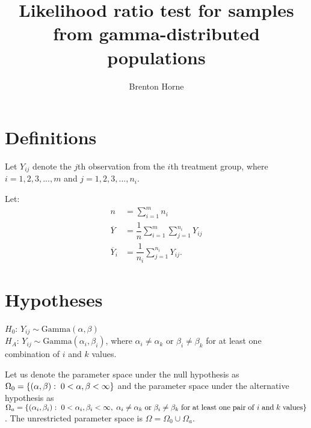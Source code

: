 \documentclass[12pt,a4paper,openright]{article}
\title{Likelihood ratio test for samples from gamma-distributed populations}
\author{Brenton Horne}
\newcommand{\GamD}{\mathrm{Gamma}}
\begin{document}
	\maketitle
	\tableofcontents
	\newpage
	
	\section{Definitions}
	Let $Y_{ij}$ denote the $j$th observation from the $i$th treatment group, where $i=1, 2, 3, ..., m$ and $j=1, 2, 3, ..., n_i$. 
	
	Let:
	\begin{align*}
		n &= \sum_{i=1}^m n_i \\
		\overline{Y} &= \dfrac{1}{n} \sum_{i=1}^m \sum_{j=1}^{n_i} Y_{ij} \\
		\overline{Y}_i &= \dfrac{1}{n_i} \sum_{j=1}^{n_i} Y_{ij}.
	\end{align*}
	
	\section{Hypotheses}
	$H_0$: $Y_{ij} \sim \GamD(\alpha, \beta)$ \\
	$H_A$: $Y_{ij} \sim \GamD(\alpha_i, \beta_i)$, where $\alpha_i \neq \alpha_k$ or $\beta_i \neq \beta_k$ for at least one combination of $i$ and $k$ values. 
	
	Let us denote the parameter space under the null hypothesis as $\Omega_0 = \left\{(\alpha, \beta): \hspace{0.1cm} 0 < \alpha, \beta < \infty\right\}$ and the parameter space under the alternative hypothesis as \\$\Omega_a = \left\{(\alpha_i, \beta_i): \hspace{0.1cm} 0 < \alpha_i, \beta_i < \infty,\hspace{0.1cm}\alpha_i \neq \alpha_k \hspace{0.1cm} \mathrm{or}\hspace{0.1cm}\beta_i \neq \beta_k \hspace{0.1cm}\mathrm{for}\hspace{0.1cm}\mathrm{at}\hspace{0.1cm}\mathrm{least}\hspace{0.1cm}\mathrm{one}\hspace{0.1cm}\mathrm{pair}\hspace{0.1cm}\mathrm{of}\hspace{0.1cm}i\hspace{0.1cm}\mathrm{and}\hspace{0.1cm}k \hspace{0.1cm}\mathrm{values}\right\}$. The unrestricted parameter space is $\Omega = \Omega_0 \cup \Omega_a$. 
	
\end{document}
